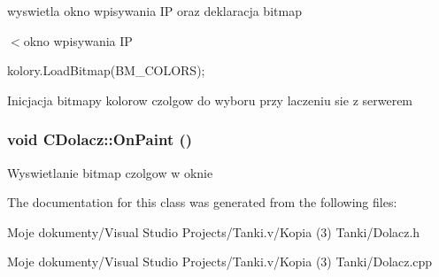 wyswietla okno wpisywania IP oraz deklaracja bitmap 



$<$okno wpisywania IP

kolory.LoadBitmap(BM\_\-COLORS);

Inicjacja bitmapy kolorow czolgow do wyboru przy laczeniu sie z serwerem 
\subsubsection{\setlength{\rightskip}{0pt plus 5cm}void CDolacz::OnPaint ()}\label{class_c_dolacz_d063ba850976d65ec2a70554f6dedb88}




Wyswietlanie bitmap czolgow w oknie 

The documentation for this class was generated from the following files:\begin{CompactItemize}
\item 
Moje dokumenty/Visual Studio Projects/Tanki.v/Kopia (3) Tanki/Dolacz.h\item 
Moje dokumenty/Visual Studio Projects/Tanki.v/Kopia (3) Tanki/Dolacz.cpp\end{CompactItemize}
